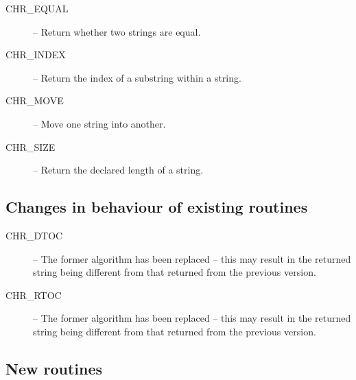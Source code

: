 \documentclass[twoside,11pt,nolof]{starlink}
\begin{document}
\begin{description}
\item [CHR\_EQUAL] -- Return whether two strings are equal.
\item [CHR\_INDEX] -- Return the index of a substring within a string.
\item [CHR\_MOVE] -- Move one string into another.
\item [CHR\_SIZE] -- Return the declared length of a string.
\end {description}


\subsection {Changes in behaviour of existing routines}

\begin{description}
\item [CHR\_DTOC] -- The former algorithm has been replaced -- this may result
in the returned string being different from that returned from the previous
version.
\item [CHR\_RTOC] -- The former algorithm has been replaced -- this may result
in the returned string being different from that returned from the previous
version.
\end {description}


\subsection {New routines}
\end{document}
